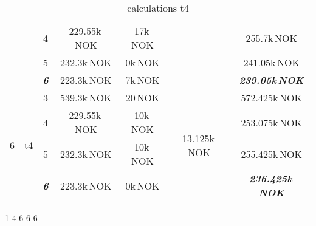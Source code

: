 \documentclass{article}
\begin{document}
\begin{table}[hbt!]
\begin{center}
\begin{tabular}[h]{|c|c|c||c|c|c||c|}
&	&	4		&		229.55k\,NOK		&	17k\,NOK		&										&	255.7k\,NOK\\
&	&	5		&		232.3k\,NOK			&	0k\,NOK			&										&	241.05k\,NOK\\
&	&	\textit{\textbf{6}}		&		223.3k\,NOK			&	7k\,NOK			&					&	\textit{\textbf{239.05k\,NOK}}\\
\hline
\multirow{4}{*}{6} & \multirow{4}{*}{t4}	
	&	3		&		539.3k\,NOK			&	20\,NOK			&	\multirow{4}{*}{13.125k\,NOK}		&	572.425k\,NOK\\
&	&	4		&		229.55k\,NOK		&	10k\,NOK		&										&	253.075k\,NOK\\
&	&	5		&		232.3k\,NOK			&	10k\,NOK		&										&	255.425k\,NOK\\
&	&	\textit{\textbf{6}}		&		223.3k\,NOK			&	0k\,NOK			&					&	\textit{\textbf{236.425k\,NOK}}\\
\hline
\end{tabular}
\caption{calculations t4}\label{tab:calct4}
\end{center}
\end{table}
1-4-6-6-6
\end{document}
